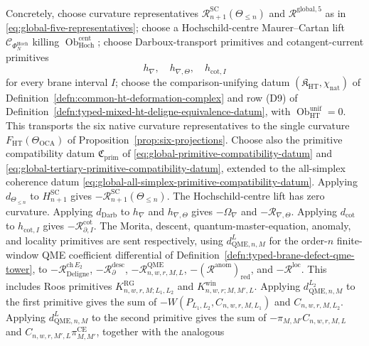 \begin{thm}
Concretely, choose curvature representatives
\(\mathcal R^{\mathrm{SC}}_{n+1}(\Theta_{\le n})\) and
\(\mathcal R^{\mathrm{global},5}\) as in
\eqref{eq:global-five-representatives}; choose a Hochschild-centre
Maurer--Cartan lift
\(\mathcal C_{\Phi_N^{\mathrm{Hoch}}}\) killing
\(\operatorname{Ob}^{\mathrm{cent}}_{\mathrm{Hoch}}\); choose
Darboux-transport primitives and cotangent-current primitives
\[
  h_{\nabla},\quad h_{\nabla,\Theta},\quad h_{\mathrm{cot},I}
\]
for every brane interval \(I\); choose the comparison-unifying datum
\((\mathfrak K_{\mathrm{HT}},\chi_{\mathrm{nat}})\) of
Definition~\ref{defn:common-ht-deformation-complex} and row
\textup{(D9)} of
Definition~\ref{defn:typed-mixed-ht-deligne-equivalence-datum}, with
\(\operatorname{Ob}^{\mathrm{unif}}_{\mathrm{HT}}=0\).  This transports
the six native curvature representatives to the single curvature
\(F_{\mathrm{HT}}(\Theta_{\mathrm{OCA}})\) of
Proposition~\ref{prop:six-projections}.  Choose also the primitive
compatibility datum \(\mathfrak C_{\mathrm{prim}}\) of
\eqref{eq:global-primitive-compatibility-datum} and
\eqref{eq:global-tertiary-primitive-compatibility-datum}, extended to
the all-simplex coherence datum
\eqref{eq:global-all-simplex-primitive-compatibility-datum}.
Applying \(d_{\Theta_{\le n}}\) to \(H^{\mathrm{SC}}_{n+1}\) gives
\(-\mathcal R^{\mathrm{SC}}_{n+1}(\Theta_{\le n})\).  The Hochschild-centre
lift has zero curvature.  Applying \(d_{\mathrm{Darb}}\) to \(h_{\nabla}\) and
\(h_{\nabla,\Theta}\) gives \(-\Omega_{\nabla}\) and
\(-\mathcal R_{\nabla,\Theta}\).  Applying \(d_{\mathrm{cot}}\) to
\(h_{\mathrm{cot},I}\) gives \(-\mathcal R^{\mathrm{cot}}_{\partial,I}\).
The Morita, descent, quantum-master-equation, anomaly, and locality primitives
are sent respectively, using \(d^{L}_{\mathrm{QME},n,M}\) for the
order-\(n\) finite-window QME coefficient differential of
Definition~\ref{defn:typed-brane-defect-qme-tower}, to
	\(-\mathcal R^{\mathrm{ch}\,E_2}_{\mathrm{Deligne}}\),
	\(-\mathcal R^{\mathrm{desc}}_{\partial}\),
	\(-\mathcal R^{\mathrm{QME}}_{n,w,r,M,L}\),
	\(-(\mathcal R^{\mathrm{anom}})_{\mathrm{red}}\), and
	\(-\mathcal R^{\mathrm{loc}}\).  This includes Roos primitives
	\(K^{\mathrm{RG}}_{n,w,r,M;L_1,L_2}\) and
	\(K^{\mathrm{win}}_{n,w,r;M,M',L}\).  Applying
	\(d^{L_2}_{\mathrm{QME},n,M}\)
	to the first primitive gives the sum of
	\(-W(P_{L_1,L_2},C_{n,w,r,M,L_1})\) and \(C_{n,w,r,M,L_2}\).  Applying
	\(d^{L}_{\mathrm{QME},n,M}\) to the second primitive gives the sum of
	\(-\pi_{M,M'}C_{n,w,r,M,L}\) and
	\(C_{n,w,r,M',L}\pi^{\mathrm{CE}}_{M,M'}\), together with the analogous

\end{thm}
